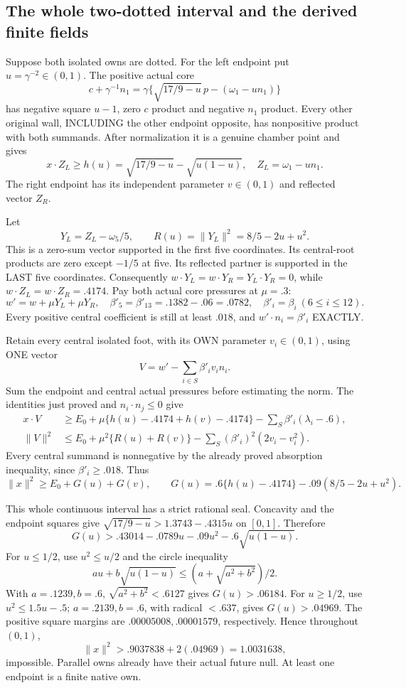\documentclass[11pt]{article}
\begin{document}
\subsection{The whole two-dotted interval and the derived finite fields}
\label{app:arithA17anchors}

Suppose both isolated owns are dotted.
For the left endpoint put \(u=\gamma^{-2}\in(0,1)\).
The positive actual core
\[
 c+\gamma^{-1}n_1
   =\gamma\{\sqrt{17/9-u}\,p-(\omega_1-un_1)\}
\]
has negative square \(u-1\), zero \(c\) product and negative
\(n_1\) product.
Every other original wall, INCLUDING the other endpoint opposite,
has nonpositive product with both summands.
After normalization it is a genuine chamber point and gives
\[
 x\cdot Z_L\ge h(u)=\sqrt{17/9-u}-\sqrt{u(1-u)},\quad
 Z_L=\omega_1-un_1 .
\]
The right endpoint has its independent parameter \(v\in(0,1)\)
and reflected vector \(Z_R\).

Let
\[
 Y_L=Z_L-\omega_5/5,\qquad
 R(u)=\|Y_L\|^2=8/5-2u+u^2 .
\]
This is a zero-sum vector supported in the first five coordinates.
Its central-root products are zero except \(-1/5\) at five.
Its reflected partner is supported in the LAST five coordinates.
Consequently \(w\cdot Y_L=w\cdot Y_R=Y_L\cdot Y_R=0\), while
\(w\cdot Z_L=w\cdot Z_R=.4174\).
Pay both actual core pressures at \(\mu=.3\):
\[
 w'=w+\mu Y_L+\mu Y_R,\quad
 \beta'_5=\beta'_{13}=.1382-.06=.0782,\quad
 \beta'_i=\beta_i\ (6\le i\le12).
\]
Every positive central coefficient is still at least \(.018\),
and \(w'\cdot n_i=\beta'_i\) EXACTLY.

Retain every central isolated foot, with its OWN parameter
\(v_i\in(0,1)\), using ONE vector
\[
                       V=w'-\sum_{i\in S}\beta'_iv_in_i .
\]
Sum the endpoint and central actual pressures before estimating
the norm.  The identities just proved and
\(n_i\cdot n_j\le0\) give
\[
 \begin{split}
 x\cdot V&\ge E_0+
 \mu\{h(u)-.4174+h(v)-.4174\}
       -\sum_S\beta'_i(\lambda_i-.6),\\
 \|V\|^2&\le E_0+\mu^2\{R(u)+R(v)\}
       -\sum_S(\beta'_i)^2(2v_i-v_i^2).
 \end{split}
\]
Every central summand is nonnegative by the already proved
absorption inequality, since \(\beta'_i\ge.018\).
Thus
\[
 \|x\|^2\ge E_0+G(u)+G(v),\qquad
 G(u)=.6\{h(u)-.4174\}-.09(8/5-2u+u^2).
\]

This whole continuous interval has a strict rational seal.
Concavity and the endpoint squares give
\(\sqrt{17/9-u}>1.3743-.4315u\) on \([0,1]\).
Therefore
\[
 G(u)>.43014-.0789u-.09u^2-.6\sqrt{u(1-u)}.
\]
For \(u\le1/2\), use \(u^2\le u/2\) and the circle inequality
\[
 au+b\sqrt{u(1-u)}\le(a+\sqrt{a^2+b^2})/2 .
\]
With \(a=.1239,b=.6\), \(\sqrt{a^2+b^2}<.6127\)
gives \(G(u)>.06184\).
For \(u\ge1/2\), use \(u^2\le1.5u-.5\);
\(a=.2139,b=.6\), with radical \(<.637\), gives
\(G(u)>.04969\).
The positive square margins are \(.00005008,.00001579\),
respectively.
Hence throughout \((0,1)\),
\[
          \|x\|^2>.9037838+2(.04969)=1.0031638,
\]
impossible.  Parallel owns already have their actual future null.
At least one endpoint is a finite native own.
\end{document}
